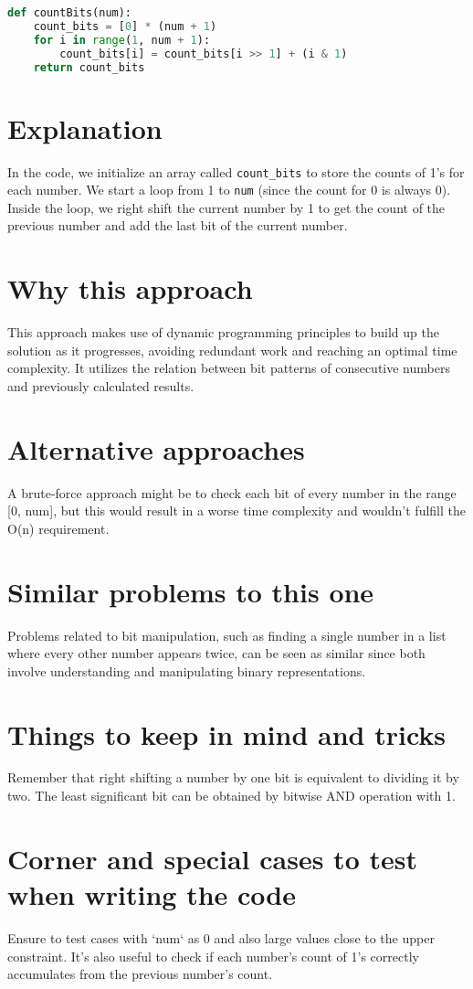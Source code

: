 \begin{fullwidth}
\begin{lstlisting}[language=Python]
def countBits(num):
    count_bits = [0] * (num + 1)
    for i in range(1, num + 1):
        count_bits[i] = count_bits[i >> 1] + (i & 1)
    return count_bits
\end{lstlisting}

\end{fullwidth}

\section*{Explanation}
In the code, we initialize an array called \texttt{count\_bits} to store the counts of 1's for each number. We start a loop from 1 to \texttt{num} (since the count for 0 is always 0). Inside the loop, we right shift the current number by 1 to get the count of the previous number and add the last bit of the current number.


\section*{Why this approach}
This approach makes use of dynamic programming principles to build up the solution as it progresses, avoiding redundant work and reaching an optimal time complexity. It utilizes the relation between bit patterns of consecutive numbers and previously calculated results.

\section*{Alternative approaches}
A brute-force approach might be to check each bit of every number in the range [0, num], but this would result in a worse time complexity and wouldn't fulfill the O(n) requirement.

\section*{Similar problems to this one}
Problems related to bit manipulation, such as finding a single number in a list where every other number appears twice, can be seen as similar since both involve understanding and manipulating binary representations.

\section*{Things to keep in mind and tricks}
Remember that right shifting a number by one bit is equivalent to dividing it by two. The least significant bit can be obtained by bitwise AND operation with 1.

\section*{Corner and special cases to test when writing the code}
Ensure to test cases with `num` as 0 and also large values close to the upper constraint. It's also useful to check if each number's count of 1's correctly accumulates from the previous number's count.